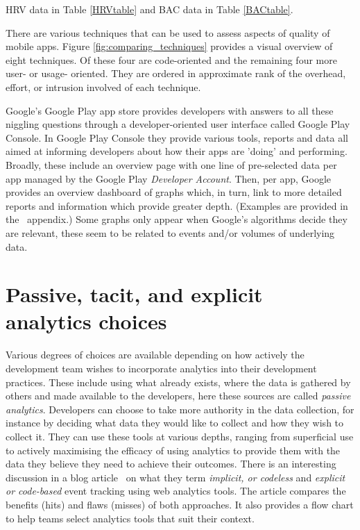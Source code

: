 HRV data in Table \ref{HRVtable} and BAC data in Table \ref{BACtable}.

There are various techniques that can be used to assess aspects of quality of mobile apps. Figure \ref{fig:comparing_techniques} provides a visual overview of eight techniques. Of these four are code-oriented and the remaining four more user- or usage- oriented. They are ordered in approximate rank of the overhead, effort, or intrusion involved of each technique. %

Google's Google Play app store provides developers with answers to all these niggling questions through a developer-oriented user interface called Google Play Console. 
In Google Play Console they provide various tools, reports and data all aimed at informing developers about how their apps are 'doing' and performing. Broadly, these include an overview page with one line of pre-selected data per app managed by the Google Play \textit{Developer Account}. Then, per app, Google provides an overview dashboard of graphs which, in turn, link to more detailed reports and information which provide greater depth. (Examples are provided in the~\href{appendix-analytics-tools}{\emph{}} appendix.)  Some graphs only appear when Google's algorithms decide they are relevant, these seem to be related to events and/or volumes of underlying data.




\section{Passive, tacit, and explicit analytics choices}
Various degrees of choices are available depending on how actively the development team wishes to incorporate analytics into their development practices. These include using what already exists, where the data is gathered by others and made available to the developers, here these sources are called \emph{passive analytics}. Developers can choose to take more authority in the data collection, for instance by deciding what data they would like to collect and how they wish to collect it. They can use these tools at various depths, ranging from superficial use to actively maximising the efficacy of using analytics to provide them with the data they believe they need to achieve their outcomes. There is an interesting discussion in a blog article~ on what they term \emph{implicit, or codeless} and \emph{explicit or code-based} event tracking using web analytics tools. The article compares the benefits (hits) and flaws (misses) of both approaches. It also provides a flow chart to help teams select analytics tools that suit their context.

